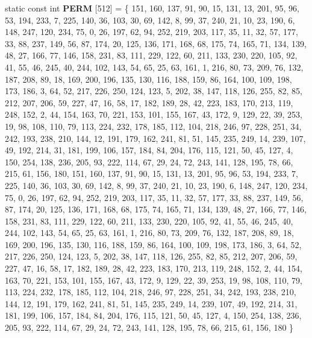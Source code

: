 \begin{DoxyCompactItemize}
\item 
\mbox{\label{classflounder_1_1noisesimplex_ad890db43bf69f4145671a3ab6e521c40}} 
static const int {\bfseries P\+E\+RM} \mbox{[}512\mbox{]} = \{ 151, 160, 137, 91, 90, 15, 131, 13, 201, 95, 96, 53, 194, 233, 7, 225, 140, 36, 103, 30, 69, 142, 8, 99, 37, 240, 21, 10, 23, 190, 6, 148, 247, 120, 234, 75, 0, 26, 197, 62, 94, 252, 219, 203, 117, 35, 11, 32, 57, 177, 33, 88, 237, 149, 56, 87, 174, 20, 125, 136, 171, 168, 68, 175, 74, 165, 71, 134, 139, 48, 27, 166, 77, 146, 158, 231, 83, 111, 229, 122, 60, 211, 133, 230, 220, 105, 92, 41, 55, 46, 245, 40, 244, 102, 143, 54, 65, 25, 63, 161, 1, 216, 80, 73, 209, 76, 132, 187, 208, 89, 18, 169, 200, 196, 135, 130, 116, 188, 159, 86, 164, 100, 109, 198, 173, 186, 3, 64, 52, 217, 226, 250, 124, 123, 5, 202, 38, 147, 118, 126, 255, 82, 85, 212, 207, 206, 59, 227, 47, 16, 58, 17, 182, 189, 28, 42, 223, 183, 170, 213, 119, 248, 152, 2, 44, 154, 163, 70, 221, 153, 101, 155, 167, 43, 172, 9, 129, 22, 39, 253, 19, 98, 108, 110, 79, 113, 224, 232, 178, 185, 112, 104, 218, 246, 97, 228, 251, 34, 242, 193, 238, 210, 144, 12, 191, 179, 162, 241, 81, 51, 145, 235, 249, 14, 239, 107, 49, 192, 214, 31, 181, 199, 106, 157, 184, 84, 204, 176, 115, 121, 50, 45, 127, 4, 150, 254, 138, 236, 205, 93, 222, 114, 67, 29, 24, 72, 243, 141, 128, 195, 78, 66, 215, 61, 156, 180, 151, 160, 137, 91, 90, 15, 131, 13, 201, 95, 96, 53, 194, 233, 7, 225, 140, 36, 103, 30, 69, 142, 8, 99, 37, 240, 21, 10, 23, 190, 6, 148, 247, 120, 234, 75, 0, 26, 197, 62, 94, 252, 219, 203, 117, 35, 11, 32, 57, 177, 33, 88, 237, 149, 56, 87, 174, 20, 125, 136, 171, 168, 68, 175, 74, 165, 71, 134, 139, 48, 27, 166, 77, 146, 158, 231, 83, 111, 229, 122, 60, 211, 133, 230, 220, 105, 92, 41, 55, 46, 245, 40, 244, 102, 143, 54, 65, 25, 63, 161, 1, 216, 80, 73, 209, 76, 132, 187, 208, 89, 18, 169, 200, 196, 135, 130, 116, 188, 159, 86, 164, 100, 109, 198, 173, 186, 3, 64, 52, 217, 226, 250, 124, 123, 5, 202, 38, 147, 118, 126, 255, 82, 85, 212, 207, 206, 59, 227, 47, 16, 58, 17, 182, 189, 28, 42, 223, 183, 170, 213, 119, 248, 152, 2, 44, 154, 163, 70, 221, 153, 101, 155, 167, 43, 172, 9, 129, 22, 39, 253, 19, 98, 108, 110, 79, 113, 224, 232, 178, 185, 112, 104, 218, 246, 97, 228, 251, 34, 242, 193, 238, 210, 144, 12, 191, 179, 162, 241, 81, 51, 145, 235, 249, 14, 239, 107, 49, 192, 214, 31, 181, 199, 106, 157, 184, 84, 204, 176, 115, 121, 50, 45, 127, 4, 150, 254, 138, 236, 205, 93, 222, 114, 67, 29, 24, 72, 243, 141, 128, 195, 78, 66, 215, 61, 156, 180 \}

\end{DoxyCompactItemize}
